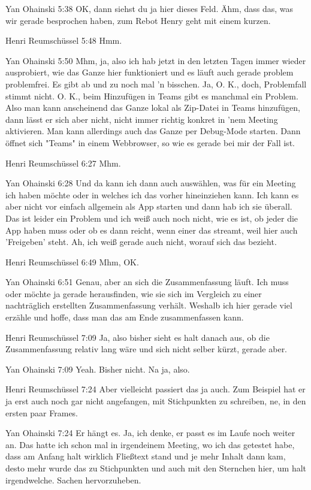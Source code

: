 Yan Ohainski   5:38
OK, dann siehst du ja hier dieses Feld.
Ähm, dass das, was wir gerade besprochen haben, zum Rebot Henry geht mit einem kurzen.

Henri Reumschüssel   5:48
Hmm.

Yan Ohainski   5:50
Mhm, ja, also ich hab jetzt in den letzten Tagen immer wieder ausprobiert, wie das Ganze hier funktioniert und es läuft auch gerade problem problemfrei. Es gibt ab und zu noch mal 'n bisschen.
Ja, O. K., doch, Problemfall stimmt nicht. O. K., beim Hinzufügen in Teams gibt es manchmal ein Problem. Also man kann anscheinend das Ganze lokal als Zip-Datei in Teams hinzufügen, dann lässt er sich aber nicht, nicht immer richtig konkret in 'nem Meeting aktivieren.
Man kann allerdings auch das Ganze per Debug-Mode starten. Dann öffnet sich "Teams" in einem Webbrowser, so wie es gerade bei mir der Fall ist.

Henri Reumschüssel   6:27
Mhm.

Yan Ohainski   6:28
Und da kann ich dann auch auswählen, was für ein Meeting ich haben möchte oder in welches ich das vorher hineinziehen kann. Ich kann es aber nicht vor einfach allgemein als App starten und dann hab ich sie überall. Das ist leider ein Problem und ich weiß auch noch nicht, wie es ist, ob jeder die App haben muss oder ob es dann reicht, wenn einer das streamt, weil hier auch 'Freigeben' steht.
Ah, ich weiß gerade auch nicht, worauf sich das bezieht.

Henri Reumschüssel   6:49
Mhm, OK.

Yan Ohainski   6:51
Genau, aber an sich die Zusammenfassung läuft. Ich muss oder möchte ja gerade herausfinden, wie sie sich im Vergleich zu einer nachträglich erstellten Zusammenfassung verhält.
Weshalb ich hier gerade viel erzähle und hoffe, dass man das am Ende zusammenfassen kann.

Henri Reumschüssel   7:09
Ja, also bisher sieht es halt danach aus, ob die Zusammenfassung relativ lang wäre und sich nicht selber kürzt, gerade aber.

Yan Ohainski   7:09
Yeah.
Bisher nicht. Na ja, also.

Henri Reumschüssel   7:24
Aber vielleicht passiert das ja auch. Zum Beispiel hat er ja erst auch noch gar nicht angefangen, mit Stichpunkten zu schreiben, ne, in den ersten paar Frames.

Yan Ohainski   7:24
Er hängt es.
Ja, ich denke, er passt es im Laufe noch weiter an. Das hatte ich schon mal in irgendeinem Meeting, wo ich das getestet habe, dass am Anfang halt wirklich Fließtext stand und je mehr Inhalt dann kam, desto mehr wurde das zu Stichpunkten und auch mit den Sternchen hier, um halt irgendwelche.
Sachen hervorzuheben.

